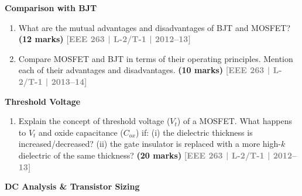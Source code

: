 \documentclass[12pt,a4paper]{article}
\newcommand{\yr}[1]{\hfill\textcolor{gray}{\small\textbf{[#1]}}}
\newcommand{\mk}[1]{\textcolor{orange!70!black}{\small\textbf{(#1 marks)}}}
\newcommand{\subtopic}[2]{%
  \vspace{10pt}
  \noindent\begin{tcolorbox}[colback=#1!8,colframe=#1,boxrule=0.6pt,arc=4pt,
    left=6pt,right=6pt,top=4pt,bottom=4pt]
    \small\bfseries\textcolor{#1}{#2}
  \end{tcolorbox}
  \vspace{2pt}
}
\begin{document}
\subtopic{cA}{Comparison with BJT}
\label{sub:s3-compare}

\begin{enumerate}

\item What are the mutual advantages and disadvantages of BJT and MOSFET?
\mk{12} \yr{EEE 263 | L-2/T-1 | 2012--13}

\item Compare MOSFET and BJT in terms of their operating principles. Mention each of their advantages and disadvantages.
\mk{10} \yr{EEE 263 | L-2/T-1 | 2013--14}

\end{enumerate}

\subtopic{cA}{Threshold Voltage}
\label{sub:s3-threshold}

\begin{enumerate}

\item Explain the concept of threshold voltage ($V_t$) of a MOSFET. What happens to $V_t$ and oxide capacitance ($C_{ox}$) if: (i) the dielectric thickness is increased/decreased? (ii) the gate insulator is replaced with a more high-$k$ dielectric of the same thickness?
\mk{20} \yr{EEE 263 | L-2/T-1 | 2012--13}

\end{enumerate}

\subtopic{cA}{DC Analysis \& Transistor Sizing}
\label{sub:s3-dc}
\end{document}
